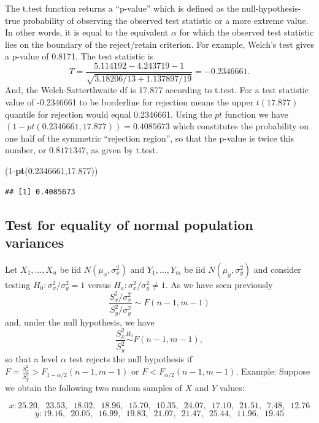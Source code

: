 \documentclass[]{book}
\newenvironment{Shaded}{\begin{snugshade}}{\end{snugshade}}
\newcommand{\KeywordTok}[1]{\textcolor[rgb]{0.13,0.29,0.53}{\textbf{{#1}}}}
\newcommand{\DecValTok}[1]{\textcolor[rgb]{0.00,0.00,0.81}{{#1}}}
\newcommand{\FloatTok}[1]{\textcolor[rgb]{0.00,0.00,0.81}{{#1}}}
\newcommand{\NormalTok}[1]{{#1}}
\begin{document}
The t.test function returns a ``p-value'' which is defined as the
null-hypothesis-true probability of observing the observed test
statistic or a more extreme value. In other words, it is equal to the
equivalent \(\alpha\) for which the observed test statistic lies on the
boundary of the reject/retain criterion. For example, Welch's test gives
a p-value of 0.8171. The test statistic is
\[T = \frac{5.114192-4.243719-1}{\sqrt{3.18206/13 + 1.137897/19}}=-0.2346661.\]
And, the Welch-Satterthwaite df is 17.877 according to t.test. For a
test statistic value of -0.2346661 to be borderline for rejection means
the upper \(t(17.877)\) quantile for rejection would equal 0.2346661.
Using the \(pt\) function we have
\((1-pt(0.2346661,17.877)) = 0.4085673\) which constitutes the
probability on one half of the symmetric ``rejection region'', so that
the p-value is twice this number, or \(0.8171347\), as given by t.test.

\begin{Shaded}
\begin{Highlighting}[]
\NormalTok{(}\DecValTok{1}\NormalTok{-}\KeywordTok{pt}\NormalTok{(}\FloatTok{0.2346661}\NormalTok{,}\FloatTok{17.877}\NormalTok{))}
\end{Highlighting}
\end{Shaded}

\begin{verbatim}
## [1] 0.4085673
\end{verbatim}

\subsection{Test for equality of normal population
variances}\label{test-for-equality-of-normal-population-variances}

Let \(X_1, \ldots, X_n\) be iid \(N(\mu_x, \sigma_x^2)\) and
\(Y_1, \ldots, Y_m\) be iid \(N(\mu_y, \sigma_y^2)\) and consider
testing \(H_0:\sigma_x^2/\sigma_y^2 = 1\) versus
\(H_a: \sigma_x^2/\sigma_y^2 \ne 1\). As we have seen previously
\[\frac{S_x^2/\sigma_x^2}{S_y^2/\sigma_y^2}\sim F(n-1, m-1)\] and, under
the null hypothesis, we have
\[\frac{S_x^2}{S_y^2}\stackrel{H_0}{\sim} F(n-1, m-1),\] so that a level
\(\alpha\) test rejects the null hypothesis if
\(F = \frac{S_x^2}{S_y^2} > F_{1-\alpha/2}(n-1, m-1)\) or
\(F < F_{\alpha/2}(n-1, m-1)\). Example: Suppose we obtain the following
two random samples of \(X\) and \(Y\) values:

\[x:25.20,\,\,\, 23.53,\,\,\, 18.02,\,\,\, 18.96,\,\,\, 15.70, \,\,\,10.35, \,\,\,24.07,\,\,\, 17.10, \,\,\,21.51, \,\,\, 7.48, \,\,\,12.76 \]
\[y: 19.16,\,\,\, 20.05, \,\,\,16.99,\,\,\, 19.83,\,\,\, 21.07,\,\,\, 21.47,\,\,\, 25.44,\,\,\, 11.96,\,\,\, 19.45\]
\end{document}

